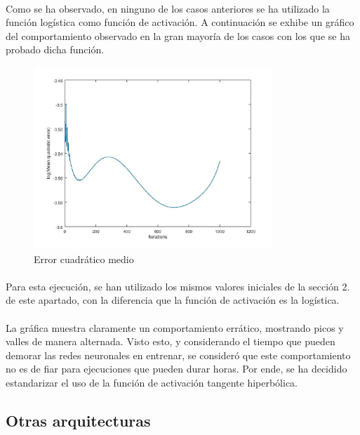 \documentclass[12pt, twocolumn]{article}
\begin{document}
	\paragraph{} Como se ha observado, en ninguno de los casos anteriores se ha utilizado la función logística como función de activación. A continuación se exhibe un gráfico del comportamiento observado en la gran mayoría de los casos con los que se ha probado dicha función.
	
	\begin{figure}[H]
		\centering
		\includegraphics[width=9cm]{../results/why_not_log.jpg}
		\caption{Error cuadrático medio}
		\label{wnl}
	\end{figure}
	
	\paragraph{} Para esta ejecución, se han utilizado los mismos valores iniciales de la sección 2. de este apartado, con la diferencia que la función de activación es la logística. 
	
	\paragraph{} La gráfica muestra claramente un comportamiento errático, mostrando picos y valles de manera alternada. Visto esto, y considerando el tiempo que pueden demorar las redes neuronales en entrenar, se consideró que este comportamiento no es de fiar para ejecuciones que pueden durar horas. Por ende, se ha decidido estandarizar el uso de la función de activación tangente hiperbólica. 
	
	\subsection{Otras arquitecturas}
	
\end{document}
